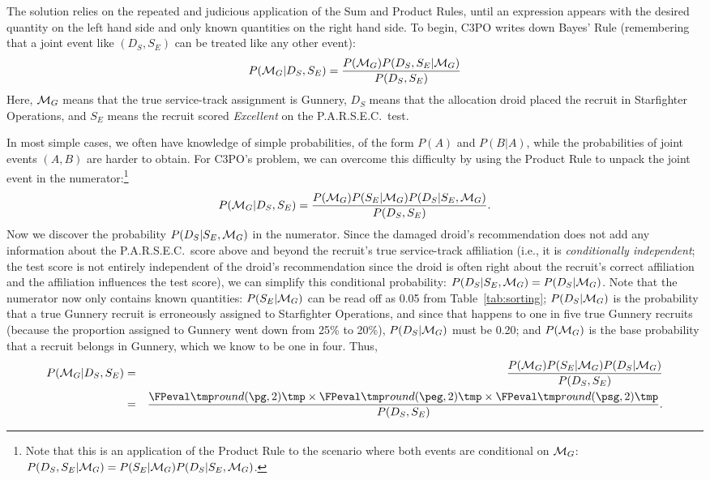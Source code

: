 The solution relies on the repeated and judicious application of the Sum and Product Rules, until an expression appears with the desired quantity on the left hand side and only known quantities on the right hand side. To begin, C3PO writes down Bayes' Rule (remembering that a joint event like $(D_S, S_E)$ can be treated like any other event):
$$P({\cal M}_G|D_S,S_E) = \frac{P({\cal M}_G)P(D_S,S_E|{\cal M}_G)}{P(D_S,S_E)}$$ Here, ${\cal M}_G$ means that the true service-track assignment is Gunnery, $D_S$ means that the allocation droid placed the recruit in Starfighter Operations, and $S_E$ means the recruit scored \emph{Excellent} on the P.A.R.S.E.C.\ test.

In most simple cases, we often have knowledge of simple probabilities, of the form $P(A)$ and $P(B|A)$, while the probabilities of joint events $(A,B)$ are harder to obtain. For C3PO's problem, we can overcome this difficulty by using the Product Rule to unpack the joint event in the numerator:\footnote{Note that this is an application of the Product Rule to the scenario where both events are conditional on ${\cal M}_G$: $P(D_S,S_E|{\cal M}_G) = P(S_E|{\cal M}_G)P(D_S|S_E,{\cal M}_G)$.} $$P({\cal M}_G|D_S,S_E) = \frac{P({\cal M}_G)P(S_E|{\cal M}_G)P(D_S|S_E,{\cal M}_G)}{P(D_S,S_E)}.$$ Now we discover the probability $P(D_S|S_E,{\cal M}_G)$ in the numerator. Since the damaged droid's recommendation does not add any information about the P.A.R.S.E.C.\ score above and beyond the recruit's true service-track affiliation (i.e., it is \emph{conditionally independent}; the test score is not entirely independent of the droid's recommendation since the droid is often right about the recruit's correct affiliation and the affiliation influences the test score), we can simplify this conditional probability: $P(D_S|S_E,{\cal M}_G) = P(D_S|{\cal M}_G)$. Note that the numerator now only contains known quantities: $P(S_E|{\cal M}_G)$ can be read off as 0.05 from Table~\ref{tab:sorting}; $P(D_S|{\cal M}_G)$ is the probability that a true Gunnery recruit is erroneously assigned to Starfighter Operations, and since that happens to one in five true Gunnery recruits (because the proportion assigned to Gunnery went down from 25\% to 20\%), $P(D_S|{\cal M}_G)$ must be 0.20; and $P({\cal M}_G)$ is the base probability that a recruit belongs in Gunnery, which we know to be one in four. Thus,
\begin{eqnarray*}
P(\H_G|D_S,S_E) &=& \frac{P(\H_G)P(S_E|\H_G)P(D_S|\H_G)}{P(D_S,S_E)} \\  
& = & \frac{\print[2]{\pg} \times \print[2]{\peg} \times \print[2]{\psg}}{P(D_S,S_E)}.
\end{eqnarray*}

